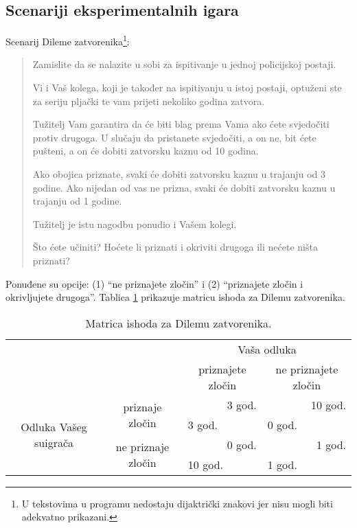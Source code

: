 \documentclass[a4paper, 12pt]{report}
\begin{document}
\makeatletter
{}
\makeatother
\begin{appendices}

\subsection{Scenariji eksperimentalnih igara}

Scenarij Dileme zatvorenika\footnote{U tekstovima u programu nedostaju dijaktrički
    znakovi jer nisu mogli biti adekvatno prikazani.}: 
\begin{quote}
Zamislite da se nalazite u sobi za ispitivanje u jednoj policijskoj postaji.  

Vi i Vaš kolega, koji je također na ispitivanju u istoj postaji, optuženi ste
za seriju pljački te vam prijeti nekoliko godina zatvora. 

Tužitelj Vam garantira da će biti blag prema Vama ako ćete svjedočiti protiv
drugoga. U slučaju da pristanete svjedočiti, a on ne, bit ćete pušteni, a on će
dobiti zatvorsku kaznu od 10 godina.

Ako obojica priznate, svaki će dobiti zatvorsku kaznu u trajanju od 3 godine.
Ako nijedan od vas ne prizna, svaki će dobiti zatvorsku kaznu u trajanju od 1
godine.

Tužitelj je istu nagodbu ponudio i Vašem kolegi. 

Što ćete učiniti? Hoćete li priznati i okriviti drugoga ili nećete ništa priznati?
\end{quote}

Ponuđene su opcije: (1) \enquote{ne priznajete zločin} i (2) \enquote{priznajete
    zločin i okrivljujete drugoga}. Tablica \ref{pdtab} prikazuje matricu ishoda
za Dilemu zatvorenika. 

\begin{table}[!h]
    \centering
    \caption{Matrica ishoda za Dilemu zatvorenika. \label{pdtab}}
\begin{tabular}{cccc}
\toprule[1pt]
    & & \multicolumn{2}{c}{\textcolor{plava}{Vaša odluka}}\\
    \cmidrule[0.5pt]{3-4}
        & & priznajete zločin & ne priznajete zločin\\
        \multirow{4}{*}{\textcolor{zelena}{Odluka Vašeg suigrača}} & \multirow{2}{*}{priznaje
        zločin} & \multicolumn{1}{r}{\textcolor{plava}{3 god.}} &
    \multicolumn{1}{r}{\textcolor{plava}{10 god.}}\\
                 & & \multicolumn{1}{l}{\textcolor{zelena}{3 god.}} &
                 \multicolumn{1}{l}{\textcolor{zelena}{0 god.}}\\
        \cmidrule[0.5pt]{2-4}
        & \multirow{2}{*}{ne priznaje zločin} &
        \multicolumn{1}{r}{\textcolor{plava}{0 god.}} &
        \multicolumn{1}{r}{\textcolor{plava}{1 god.}}\\
        & & \multicolumn{1}{l}{\textcolor{zelena}{10 god.}} &
        \multicolumn{1}{l}{\textcolor{zelena}{1 god.}}\\
	\bottomrule[1pt]
\end{tabular}
\end{table}


\end{appendices}
\end{document}
